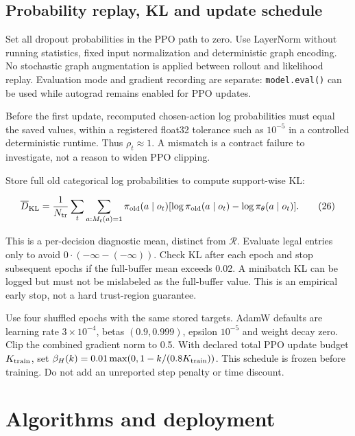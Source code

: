 \documentclass[10pt,a4paper]{article}
\begin{document}
\hypertarget{probability-replay-kl-and-update-schedule}{%
\subsection{Probability replay, KL and update
schedule}\label{probability-replay-kl-and-update-schedule}}

Set all dropout probabilities in the PPO path to zero. Use LayerNorm
without running statistics, fixed input normalization and deterministic
graph encoding. No stochastic graph augmentation is applied between
rollout and likelihood replay. Evaluation mode and gradient recording
are separate: \texttt{model.eval()} can be used while autograd remains
enabled for PPO updates.

Before the first update, recomputed chosen-action log probabilities must
equal the saved values, within a registered float32 tolerance such as
\(10^{-5}\) in a controlled deterministic runtime. Thus
\(\rho_t\approx1\). A mismatch is a contract failure to investigate, not
a reason to widen PPO clipping.

Store full old categorical log probabilities to compute support-wise KL:

\[
\overline D_{\rm KL}
=\frac1{N_{\rm tr}}\sum_t\sum_{a:M_t(a)=1}
\pi_{\rm old}(a\mid o_t)
[\log\pi_{\rm old}(a\mid o_t)-\log\pi_\theta(a\mid o_t)].
\tag{26}
\]

This is a per-decision diagnostic mean, distinct from \(\mathcal R\).
Evaluate legal entries only to avoid \(0\cdot(-\infty-(-\infty))\).
Check KL after each epoch and stop subsequent epochs if the full-buffer
mean exceeds 0.02. A minibatch KL can be logged but must not be
mislabeled as the full-buffer value. This is an empirical early stop,
not a hard trust-region guarantee.

Use four shuffled epochs with the same stored targets. AdamW defaults
are learning rate \(3\times10^{-4}\), betas \((0.9,0.999)\), epsilon
\(10^{-5}\) and weight decay zero. Clip the combined gradient norm to
0.5. With declared total PPO update budget \(K_{\rm train}\), set
\(\beta_H(k)=0.01\max(0,1-k/(0.8K_{\rm train}))\). This schedule is
frozen before training. Do not add an unreported step penalty or time
discount.


\hypertarget{algorithms-and-deployment}{%
\section{Algorithms and deployment}\label{algorithms-and-deployment}}
\end{document}
